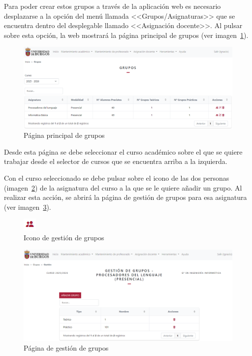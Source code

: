 Para poder crear estos grupos a través de la aplicación web es necesario desplazarse a la opción del menú llamada <<Grupos/Asignaturas>> que se encuentra dentro del desplegable llamado <<Asignación docente>>.
Al pulsar sobre esta opción, la web mostrará la página principal de grupos (ver imagen~\ref{pag:grupos}).

\begin{figure}
	\centering
	\includegraphics[width=\textwidth]{../img/Anexos/Manual usuario/grupos.png}
	\caption{Página principal de grupos}\label{pag:grupos}
\end{figure}

Desde esta página se debe seleccionar el curso académico sobre el que se quiere trabajar desde el selector de cursos que se encuentra arriba a la izquierda.

Con el curso seleccionado se debe pulsar sobre el icono de las dos personas (imagen~\ref{pag:icnGestionGrupos}) de la asignatura del curso a la que se le quiere añadir un grupo.
Al realizar esta acción, se abrirá la página de gestión de grupos para esa asignatura (ver imagen~\ref{pag:gestionGrupos}).

\begin{figure}
	\centering
	\includegraphics[width=.07\textwidth]{../img/Anexos/Manual usuario/icnGestionGrupos.png}
	\caption{Icono de gestión de grupos}\label{pag:icnGestionGrupos}
\end{figure}

\begin{figure}
	\centering
	\includegraphics[width=\textwidth]{../img/Anexos/Manual usuario/gestionGrupos.png}
	\caption{Página de gestión de grupos}\label{pag:gestionGrupos}
\end{figure}

